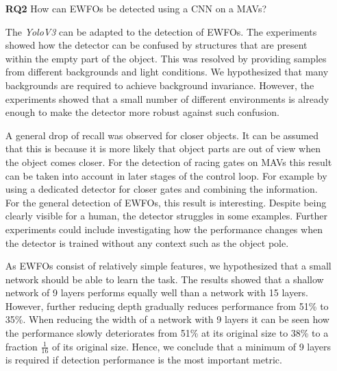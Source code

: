 \begin{enumerate}
	In summary, we propose to fully synthesize environments when creating training data for the detection of \acp{EWFO} on \acp{MAV}. Furthermore, the precision can be improved by training the detector based on view angles it will see in the real world, possibly by simulating the flight behaviour. In order to transfer the detector to the real world, we recommend to use image augmentation. Particularly augmenting the images by modelling lens distortion improves the performance on the investigated dataset.

	\item[\textbf{RQ2}]How can \acp{EWFO} be detected using a \ac{CNN} on a \acp{MAV}?
	
	The \textit{YoloV3} can be adapted to the detection of \acp{EWFO}. The experiments showed how the detector can be confused by structures that are present within the empty part of the object. This was resolved by providing samples from different backgrounds and light conditions. We hypothesized that many backgrounds are required to achieve background invariance. However, the experiments showed that a small number of different environments is already enough to make the detector more robust against such confusion.
		
	A general drop of recall was observed for closer objects. It can be assumed that this is because it is more likely that object parts are out of view when the object comes closer. For the detection of racing gates on \acp{MAV} this result can be taken into account in later stages of the control loop. For example by using a dedicated detector for closer gates and combining the information. For the general detection of \acp{EWFO}, this result is interesting. Despite being clearly visible for a human, the detector struggles in some examples. Further experiments could include investigating how the performance changes when the detector is trained without any context such as the object pole.
	
	As \acp{EWFO} consist of relatively simple features, we hypothesized that a small network should be able to learn the task. The results showed that a shallow network of 9 layers performs equally well than a network with 15 layers. However, further reducing depth gradually reduces performance from 51\% to 35\%. When reducing the width of a network with 9 layers it can be seen how the performance slowly deteriorates from 51\% at its original size to 38\% to a fraction $\frac{1}{16}$ of its original size. 
	Hence, we conclude that a minimum of 9 layers is required if detection performance is the most important metric.
	

\end{enumerate}
